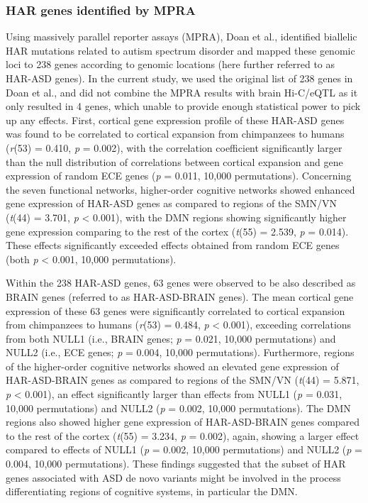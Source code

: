 \begin{refsection}
\subsubsection{HAR genes identified by MPRA}
Using massively parallel reporter assays (MPRA), Doan et al., \citep{doan2016mutations} identified biallelic HAR mutations related to autism spectrum disorder and mapped these genomic loci to 238 genes according to genomic locations (here further referred to as HAR-ASD genes). In the current study, we used the original list of 238 genes in Doan et al., \citep{doan2016mutations} and did not combine the MPRA results with brain Hi-C/eQTL as it only resulted in 4 genes, which unable to provide enough statistical power to pick up any effects. First, cortical gene expression profile of these HAR-ASD genes was found to be correlated to cortical expansion from chimpanzees to humans (\textit{r}(53) = 0.410, \textit{p} = 0.002), with the correlation coefficient significantly larger than the null distribution of correlations between cortical expansion and gene expression of random ECE genes (\textit{p} = 0.011, 10,000 permutations). Concerning the seven functional networks, higher-order cognitive networks showed enhanced gene expression of HAR-ASD genes as compared to regions of the SMN/VN (\textit{t}(44) = 3.701, \textit{p} < 0.001), with the DMN regions showing significantly higher gene expression comparing to the rest of the cortex (\textit{t}(55) = 2.539, \textit{p} = 0.014). These effects significantly exceeded effects obtained from random ECE genes (both \textit{p} < 0.001, 10,000 permutations).

 Within the 238 HAR-ASD genes, 63 genes were observed to be also described as BRAIN genes (referred to as HAR-ASD-BRAIN genes). The mean cortical gene expression of these 63 genes were significantly correlated to cortical expansion from chimpanzees to humans (\textit{r}(53) = 0.484, \textit{p} < 0.001), exceeding correlations from both NULL1 (i.e., BRAIN genes; \textit{p} = 0.021, 10,000 permutations) and NULL2 (i.e., ECE genes; \textit{p} = 0.004, 10,000 permutations). Furthermore, regions of the higher-order cognitive networks showed an elevated gene expression of HAR-ASD-BRAIN genes as compared to regions of the SMN/VN (\textit{t}(44) = 5.871, \textit{p} < 0.001), an effect significantly larger than effects from NULL1 (\textit{p} = 0.031, 10,000 permutations) and NULL2 (\textit{p} = 0.002, 10,000 permutations). The DMN regions also showed higher gene expression of HAR-ASD-BRAIN genes compared to the rest of the cortex (\textit{t}(55) = 3.234, \textit{p} = 0.002), again, showing a larger effect compared to effects of NULL1 (\textit{p} = 0.002, 10,000 permutations) and NULL2 (\textit{p} = 0.004, 10,000 permutations). These findings suggested that the subset of HAR genes associated with ASD de novo variants might be involved in the process differentiating regions of cognitive systems, in particular the DMN.


\end{refsection}
